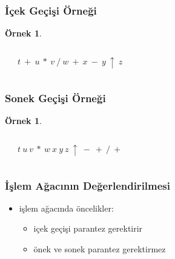 \documentclass[dvipsnames]{beamer}
\theoremstyle{definition}
\theoremstyle{example}
\newtheorem{ornek}[theorem]{Örnek}
\theoremstyle{plain}
\begin{document}
\begin{frame}
  \frametitle{İçek Geçişi Örneği}

  \begin{ornek}
    \begin{columns}
      \begin{center}
      \end{center}

      \pause
      $t ~ + ~ u ~ * ~ v ~ / ~ w ~ + ~ x ~ - ~ y ~ \uparrow ~ z$
    \end{columns}
  \end{ornek}
\end{frame}

\begin{frame}
  \frametitle{Sonek Geçişi Örneği}

  \begin{ornek}
    \begin{columns}
      \begin{center}
      \end{center}

      \pause
      $t ~ u ~ v ~ * ~ w ~ x ~ y ~ z ~ \uparrow ~ - ~ + ~ / ~ +$
    \end{columns}
  \end{ornek}
\end{frame}

\begin{frame}
  \frametitle{İşlem Ağacının Değerlendirilmesi}

  \begin{itemize}
    \item işlem ağacında öncelikler:
    \begin{itemize}
      \item içek geçişi parantez gerektirir
      \item önek ve sonek parantez gerektirmez
    \end{itemize}
  \end{itemize}
\end{frame}
\end{document}
